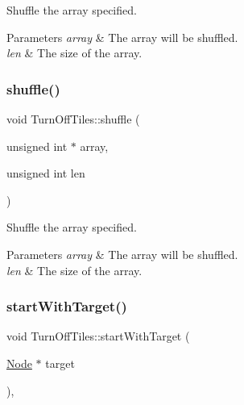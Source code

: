 Shuffle the array specified. 


\begin{DoxyParams}{Parameters}
{\em array} & The array will be shuffled. \\
\hline
{\em len} & The size of the array. \\
\hline
\end{DoxyParams}
\mbox{\label{classTurnOffTiles_a83365793aa820835828c994fc0f5c0fa}} 
\subsubsection{\texorpdfstring{shuffle()}{shuffle()}\hspace{0.1cm}{\footnotesize\ttfamily [2/2]}}
{\footnotesize\ttfamily void Turn\+Off\+Tiles\+::shuffle (\begin{DoxyParamCaption}\item[{unsigned int $\ast$}]{array,  }\item[{unsigned int}]{len }\end{DoxyParamCaption})}



Shuffle the array specified. 


\begin{DoxyParams}{Parameters}
{\em array} & The array will be shuffled. \\
\hline
{\em len} & The size of the array. \\
\hline
\end{DoxyParams}
\mbox{\label{classTurnOffTiles_ac06cc826e738b0fe0df40fe554a00d45}} 
\subsubsection{\texorpdfstring{start\+With\+Target()}{startWithTarget()}\hspace{0.1cm}{\footnotesize\ttfamily [1/2]}}
{\footnotesize\ttfamily void Turn\+Off\+Tiles\+::start\+With\+Target (\begin{DoxyParamCaption}\item[{\hyperlink{classNode}{Node} $\ast$}]{target }\end{DoxyParamCaption})\hspace{0.3cm}{\ttfamily [override]}, {\ttfamily [virtual]}}

